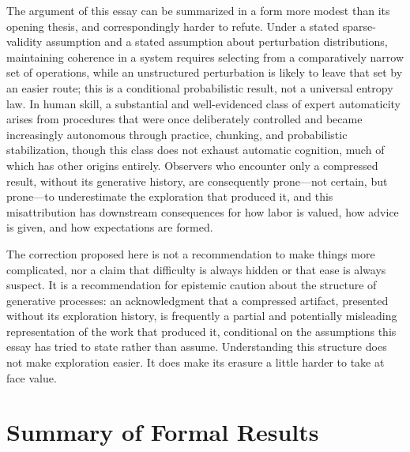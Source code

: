\documentclass[12pt, a4paper]{article}
\theoremstyle{plain}
\theoremstyle{definition}
\theoremstyle{remark}
\begin{document}
The argument of this essay can be summarized in a form more modest than its opening thesis, and correspondingly harder to refute. Under a stated sparse-validity assumption and a stated assumption about perturbation distributions, maintaining coherence in a system requires selecting from a comparatively narrow set of operations, while an unstructured perturbation is likely to leave that set by an easier route; this is a conditional probabilistic result, not a universal entropy law. In human skill, a substantial and well-evidenced class of expert automaticity arises from procedures that were once deliberately controlled and became increasingly autonomous through practice, chunking, and probabilistic stabilization, though this class does not exhaust automatic cognition, much of which has other origins entirely. Observers who encounter only a compressed result, without its generative history, are consequently prone---not certain, but prone---to underestimate the exploration that produced it, and this misattribution has downstream consequences for how labor is valued, how advice is given, and how expectations are formed.

The correction proposed here is not a recommendation to make things more complicated, nor a claim that difficulty is always hidden or that ease is always suspect. It is a recommendation for epistemic caution about the structure of generative processes: an acknowledgment that a compressed artifact, presented without its exploration history, is frequently a partial and potentially misleading representation of the work that produced it, conditional on the assumptions this essay has tried to state rather than assume. Understanding this structure does not make exploration easier. It does make its erasure a little harder to take at face value.

\newpage
\appendix

\section{Summary of Formal Results}
\end{document}

